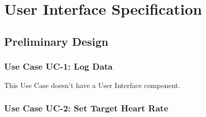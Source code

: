 \documentclass[letterpaper,english, 12pt]{scrreprt}
\begin{document}
\chapter{User Interface Specification}
\section{Preliminary Design}

\subsection{Use Case UC-1: Log Data}
This Use Case doesn't have a User Interface component.

\subsection{Use Case UC-2: Set Target Heart Rate}
\end{document}
